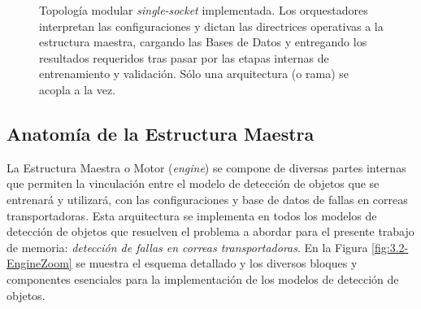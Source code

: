 \begin{figure}[H]
{
    }
    \caption{Topología modular \textit{single-socket} implementada. Los orquestadores interpretan las configuraciones y dictan las directrices operativas a la estructura maestra, cargando las Bases de Datos y entregando los resultados requeridos tras pasar por las etapas internas de entrenamiento y validación. Sólo una arquitectura (o rama) se acopla a la vez.}
    \label{fig:3.1-ModularLayer}
\end{figure}


\subsection{Anatomía de la Estructura Maestra}

La Estructura Maestra o Motor (\textit{engine}) se compone de diversas partes internas que permiten la vinculación entre el modelo de detección de objetos que se entrenará y utilizará, con las configuraciones y base de datos de fallas en correas transportadoras. Esta arquitectura se implementa en todos los modelos de detección de objetos que resuelven el problema a abordar para el presente trabajo de memoria: \textit{detección de fallas en correas transportadoras}. En la Figura \ref{fig:3.2-EngineZoom} se muestra el esquema detallado y los diversos bloques y componentes esenciales para la implementación de los modelos de detección de objetos.


